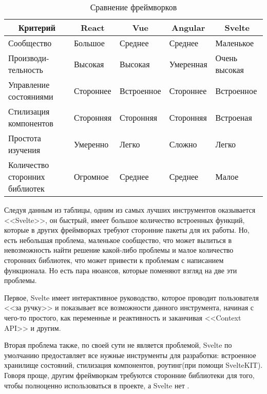 \begin{table}[H]
    \raggedright
    \caption{Сравнение фреймворков}\label{svelte-vs-others}
    \begin{tabularx}{\textwidth}{|X|X|X|X|X|}
        \hline
        \multicolumn{1}{|c|}{Критерий} & \multicolumn{1}{c|}{React} & \multicolumn{1}{c|}{Vue} & \multicolumn{1}{c|}{Angular} & \multicolumn{1}{c|}{Svelte}\\ \hline
        Сообщество                     & Большое   & Среднее    & Среднее   & Маленькое     \\
        \hline
        Производи-тельность             & Высокая   & Высокая    & Умеренная & Очень высокая \\
        \hline
        Управление состояниями         & Стороннее & Встроенное & Стороннее & Встроенное    \\
        \hline
        Стилизация компонентов         & Сторонняя & Сторонняя  & Сторонняя & Встроеная     \\
        \hline
        Простота изучения              & Умеренно  & Легко      & Сложно    & Легко         \\
        \hline
        Количество сторонних библиотек & Огромное  & Среднее    & Среднее   & Малое \\ \hline
    \end{tabularx}
\end{table}

Следуя данным из таблицы, одним из самых лучших инструментов оказывается <<Svelte>>, он быстрый, имеет большое количество встроенных функций, которые в других фреймворках требуют сторонние пакеты для их работы. Но, есть небольшая проблема, маленькое сообщество, что может вылиться в невозможность найти решение какой-либо проблемы и малое количество сторонних библиотек, что может привести к проблемам с написанием функционала. Но есть пара нюансов, которые поменяют взгляд на две эти проблемы.

Первое, Svelte имеет интерактивное руководство, которое проводит пользователя <<за ручку>> и показывает все возможности данного инструмента, начиная с чего-то простого, как переменные и реактивность и заканчивая <<Context API>> и другим.

Вторая проблема также, по своей сути не является проблемой, Svelte по умолчанию предоставляет все нужные инструменты для разработки: встроенное хранилище состояний, стилизация компонентов, роутинг(при помощи SvelteKIT). Говоря проще, другим фреймворкам требуются сторонние библиотеки для того, чтобы полноценно использоваться в проекте, а Svelte нет \cite{svelte-ecosystem}.

